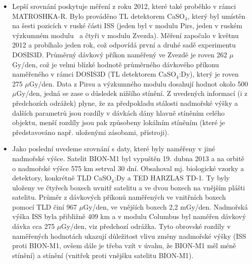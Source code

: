\begin{itemize}
není \cite{passDetectors}. (Poznámka: lze srovnat obr. \ref{fig:dosis_passDetectors_LETspektrum} s obr. \ref{fig:stineni} -- rozdíl ve spektrech je způsoben tím, že první obr. představuje diferenciální spektrum, zatímco druhý zobrazuje integrální spektrum.) 
\begin{figure}[h]
  \centering
  \texttt{[image: dosis\_LETspektrum\_passDetectors.jpg]}
  \caption{$\LET$ spektra z dat naměřených v modulu Pirs (Piers-1) a v modulu Zvezda (SM) v přílušných SPD.~\cite{passDetectors}}
  \label{fig:dosis_passDetectors_LETspektrum}
\end{figure}
\item Lepší srovnání poskytuje měření z roku 2012, které také proběhlo v rámci MATROSHKA-R. Bylo prováděno TL detektorem CaSO$_4$, který byl umístěn na šesti pozicích v ruské části ISS (jeden byl v modulu Pirs, jeden v ruském výzkumném modulu~\cite{researchModule} a čtyři v modulu Zvezda). Měření započalo v květnu 2012 a probíhalo jeden rok, což odpovídá první a druhé sadě experimentu DOSIS3D. Průměrný dávkový příkon naměřený ve Zvezdě je roven 262 $\mu$Gy/den, což je velmi blízké hodnotě průměrného dávkového příkonu naměřeného v rámci DOSIS3D (TL detektorem CaSO$_4$:Dy), který je roven 275 $\mu$Gy/den. Data z Pirsu a výzkumného modulu dosahují hodnot okolo 500 $\mu$Gy/den, jedná se zase o důsledek nižšího stínění. Z uvedených informací (i z předchozích odrážek) plyne, že za předpokladu
  stálosti nadmořské výšky a dalších parametrů jsou rozdíly v dávkách dány hlavně stíněním celého objektu, menší rozdíly jsou pak způsobeny lokálním stíněním (které je představováno např. uloženými zásobami, přístroji). \cite{ambrozova_dvaExperimenty}
  \item Jako poslední uvedeme srovnání s daty, které byly naměřeny v jiné nadmořské výšce. Satelit BION-M1 byl vypuštěn 19. dubna 2013 a na orbitě o nadmořské výšce 575 km setrval 30 dní. Obsahoval mj. biologické vzorky a detektory, konkrétně TLD CaSO$_4$:Dy a TED HARZLAS TD-1. Ty byly uloženy ve čtyřech boxech uvnitř satelitu a ve dvou boxech na vnějším plášti satelitu. Průměr z dávkových příkonů naměřených ve vnitřních boxech pomocí TLD činí 967 $\mu$Gy/den, ve vnějších boxech 2,2 mGy/den. Nadmořská výška ISS byla přibližně 409 km a v modulu Columbus byl naměřen dávkový dávka cca 275 $\mu$Gy/den, viz předchozí odrážka. Tyto obrovské rozdíly v naměřených hodnotách ukazují důležitost vlivu změny nadmořské výšky (ISS proti BION-M1, ovšem dále je třeba vzít v úvahu, že BION-M1 měl méně
	stínění) a stínění (vnitřek proti vnějšku satelitu BION-M1).~\cite{ambrozova_dvaExperimenty}
	

\end{itemize}

